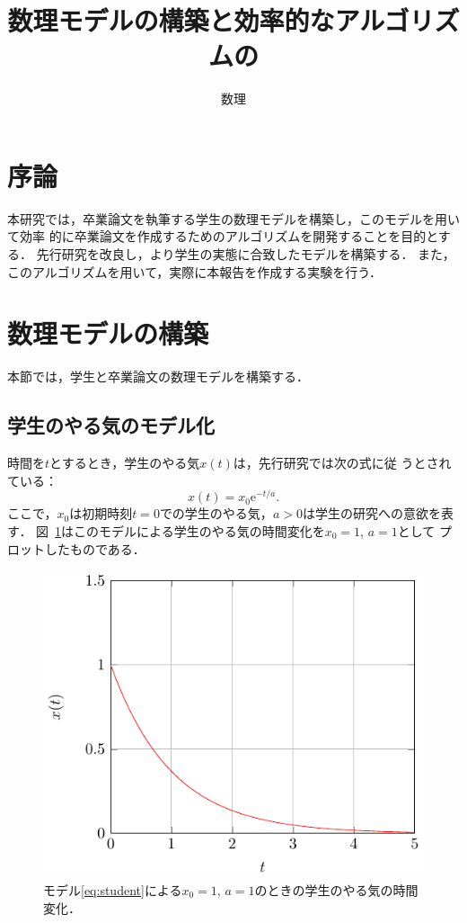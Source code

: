 \documentclass[dvipdfmx]{ampbt}
\title{数理モデルの構築と効率的なアルゴリズムの} %
      {開発に関する研究}                         %
      {}                                         %
\author{数理}{三郎}             %
\newcommand{\rme}{\mathrm{e}}
\begin{document}
\ifoutputbody
\makeinsidecover                %
\makeabstract                   %
\maketoc                        %
\setcounter{page}{1}            %
\section{序論}
本研究では，卒業論文を執筆する学生の数理モデルを構築し，このモデルを用いて効率
的に卒業論文を作成するためのアルゴリズムを開発することを目的とする．
先行研究\cite{suuri2010}を改良し，より学生の実態に合致したモデルを構築する．
また，このアルゴリズムを用いて，実際に本報告を作成する実験を行う．

\section{数理モデルの構築}
本節では，学生と卒業論文の数理モデルを構築する．

\subsection{学生のやる気のモデル化}
時間を$t$とするとき，学生のやる気$x(t)$は，先行研究\cite{suuri2010}では次の式に従
うとされている：
\begin{equation}\label{eq:student}
  x(t)=x_0 \rme^{-t/a}.
\end{equation}
ここで，$x_0$は初期時刻$t=0$での学生のやる気，$a>0$は学生の研究への意欲を表す．
図~\ref{fig:student}はこのモデルによる学生のやる気の時間変化を$x_0=1$, $a=1$として
プロットしたものである．
\begin{figure}[htbp]
  \centering
  \includegraphics{ampbt_figure.pdf}
  \caption{モデル\eqref{eq:student}による$x_0=1$, $a=1$のときの学生のやる気の時間
    変化．}
  \label{fig:student}
\end{figure}
\end{document}
